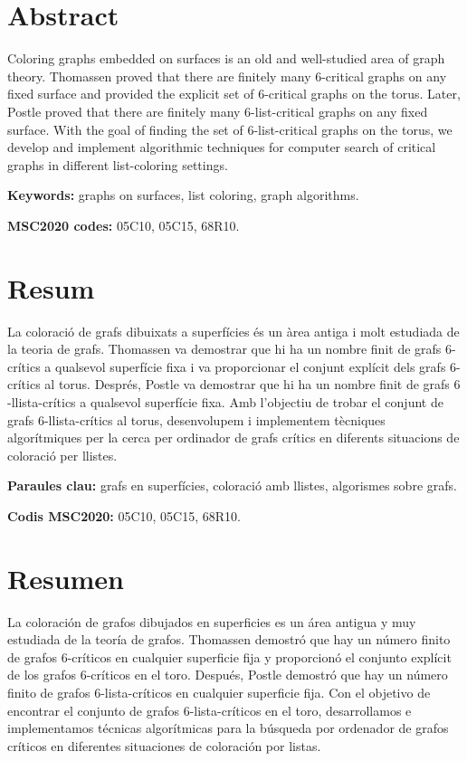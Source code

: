 \documentclass{report}
\theoremstyle{definition}
\begin{document}
\section*{Abstract}

Coloring graphs embedded on surfaces is an old and well-studied area of graph theory. Thomassen proved that there are finitely many $6$-critical graphs on any fixed surface and provided the explicit set of $6$-critical graphs on the torus. Later, Postle proved that there are finitely many $6$-list-critical graphs on any fixed surface. With the goal of finding the set of $6$-list-critical graphs on the torus, we develop and implement algorithmic techniques for computer search of critical graphs in different list-coloring settings. 

\textbf{Keywords:} graphs on surfaces, list coloring, graph algorithms.

\textbf{MSC2020 codes:} 05C10, 05C15, 68R10.

\section*{Resum}

La coloració de grafs dibuixats a superfícies és un àrea antiga i molt estudiada de la teoria de grafs. Thomassen va demostrar que hi ha un nombre finit de grafs $6$-crítics a qualsevol superfície fixa i va proporcionar el conjunt explícit dels grafs $6$-crítics al torus. Després, Postle va demostrar que hi ha un nombre finit de grafs $6$-llista-crítics a qualsevol superfície fixa. Amb l'objectiu de trobar el conjunt de grafs $6$-llista-crítics al torus, desenvolupem i implementem tècniques algorítmiques per la cerca per ordinador de grafs crítics en diferents situacions de coloració per llistes.  

\textbf{Paraules clau:} grafs en superfícies, coloració amb llistes, algorismes sobre grafs.

\textbf{Codis MSC2020:} 05C10, 05C15, 68R10.


\section*{Resumen}

La coloración de grafos dibujados en superficies es un área antigua y muy estudiada de la teoría de grafos. Thomassen demostró que hay un número finito de grafos $6$-críticos en cualquier superficie fija y proporcionó el conjunto explícit de los grafos $6$-críticos en el toro. Después, Postle demostró que hay un número finito de grafos 6-lista-críticos en cualquier superficie fija. Con el objetivo de encontrar el conjunto de grafos $6$-lista-críticos en el toro, desarrollamos e implementamos técnicas algorítmicas para la búsqueda por ordenador de grafos críticos en diferentes situaciones de coloración por listas.
\end{document}
